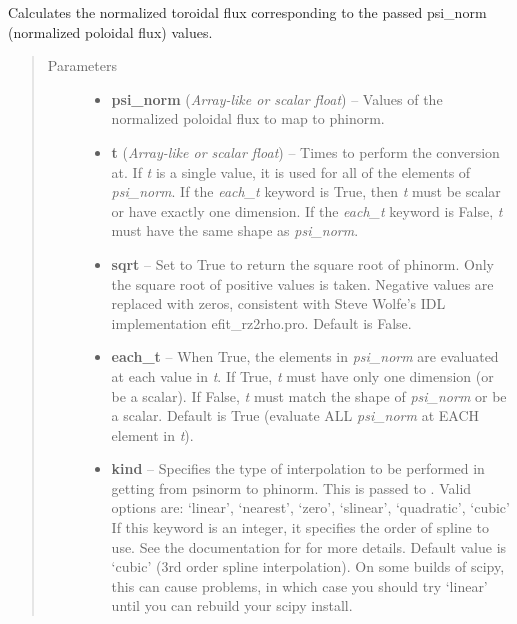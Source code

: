 \documentclass[letterpaper,10pt,english]{sphinxmanual}
\begin{document}
\begin{fulllineitems}
\begin{fulllineitems}
\end{fulllineitems}


\begin{fulllineitems}
\label{eqtools:eqtools.core.Equilibrium.psinorm2phinorm}
Calculates the normalized toroidal flux corresponding to the passed psi\_norm (normalized poloidal flux) values.
\begin{quote}\begin{description}
\item[{Parameters}] \leavevmode\begin{itemize}
\item {} 
\textbf{psi\_norm} (\emph{Array-like or scalar float}) -- Values of the normalized
poloidal flux to map to phinorm.

\item {} 
\textbf{t} (\emph{Array-like or scalar float}) -- Times to perform the conversion at.
If \emph{t} is a single value, it is used for all of the elements of
\emph{psi\_norm}. If the \emph{each\_t} keyword is True, then \emph{t} must be scalar
or have exactly one dimension. If the \emph{each\_t} keyword is False,
\emph{t} must have the same shape as \emph{psi\_norm}.

\item {} 
\textbf{sqrt} -- Set to True to return the square root of phinorm. Only
the square root of positive values is taken. Negative values are
replaced with zeros, consistent with Steve Wolfe's IDL
implementation efit\_rz2rho.pro. Default is False.

\item {} 
\textbf{each\_t} -- When True, the elements in \emph{psi\_norm} are evaluated at
each value in \emph{t}. If True, \emph{t} must have only one dimension (or
be a scalar). If False, \emph{t} must match the shape of \emph{psi\_norm} or be
a scalar. Default is True (evaluate ALL \emph{psi\_norm} at EACH element in
\emph{t}).

\item {} 
\textbf{kind} -- Specifies the type of
interpolation to be performed in getting from psinorm to
phinorm. This is passed to
. Valid options are:
`linear', `nearest', `zero', `slinear', `quadratic', `cubic'
If this keyword is an integer, it specifies the order of spline
to use. See the documentation for  for more
details. Default value is `cubic' (3rd order spline
interpolation). On some builds of scipy, this can cause problems,
in which case you should try `linear' until you can rebuild your
scipy install.


\end{itemize}
\end{description}
\end{quote}
\end{fulllineitems}
\end{fulllineitems}
\end{document}
